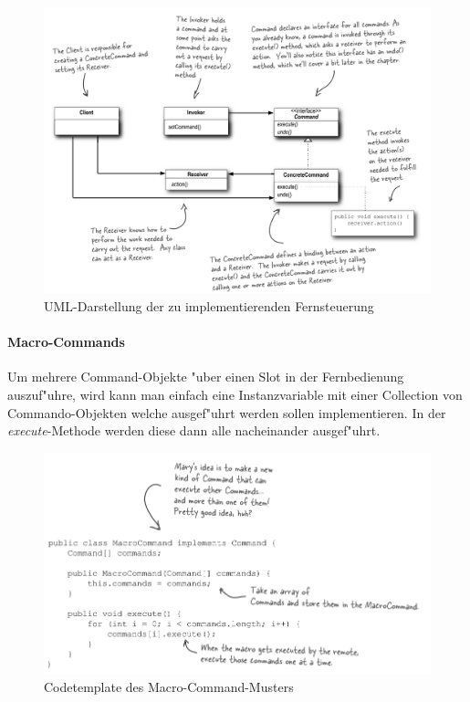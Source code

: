 \begin{figure}[b!]
	\centering
	\includegraphics[width=1\linewidth]{command/img/commandUML}
	\caption{UML-Darstellung der zu implementierenden Fernsteuerung}
	\label{fig:commandUML}
\end{figure}

\paragraph{Macro-Commands}
Um mehrere Command-Objekte "uber einen Slot in der Fernbedienung auszuf"uhre, wird kann man einfach eine Instanzvariable mit einer Collection von Commando-Objekten welche ausgef"uhrt werden sollen implementieren. In der \emph{execute}-Methode werden diese dann alle nacheinander ausgef"uhrt. 

\begin{figure}[b!]
	\centering
	\includegraphics[width=1\linewidth]{command/img/macroCommandCodeExample}
	\caption{Codetemplate des Macro-Command-Musters}
	\label{fig:macroCommand}
\end{figure}


